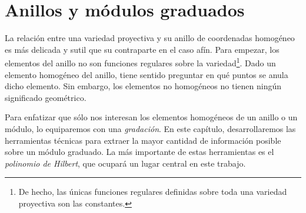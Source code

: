 \chapter{Anillos y módulos graduados}

\noindent La relación entre una variedad proyectiva y su anillo de coordenadas homogéneo es más delicada y sutil que su contraparte en el caso afín. Para empezar, los elementos del anillo no son funciones regulares sobre la variedad\footnote{De hecho, las únicas funciones regulares definidas sobre toda una variedad proyectiva son las constantes.}. Dado un elemento homogéneo del anillo, tiene sentido preguntar en qué puntos se anula dicho elemento. Sin embargo, los elementos no homogéneos no tienen ningún significado geométrico.

Para enfatizar que sólo nos interesan los elementos homogéneos de un anillo o un módulo, lo equiparemos con una \textit{gradación}. En este capítulo, desarrollaremos las herramientas técnicas para extraer la mayor cantidad de información posible sobre un módulo graduado. La más importante de estas herramientas es el \textit{polinomio de Hilbert}, que ocupará un lugar central en este trabajo.
